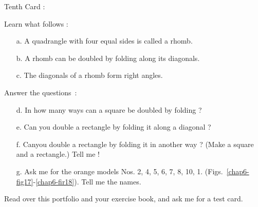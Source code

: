 Tenth Card :

Learn what follows :
\begin{itemize}
\item[a.] A quadrangle with four equal sides is called a rhomb.

\item[b.] A rhomb can be doubled by folding along its diagonals.

\item[c.] The diagonals of a rhomb form right angles.
\end{itemize}

Answer the questions~:
\begin{itemize}
\item[d.] In how many ways can a square be doubled by folding ?

\item[e.] Can you double a rectangle by folding it along a diagonal ?

\item[f.] Can\pageoriginale you double a rectangle by folding it in another way ? (Make a square and a rectangle.) Tell me !

\item[g.] Ask me for the orange models Nos. 2, 4, 5, 6, 7, 8, 10, 1. (Figs.~\ref{chap6-fig17}-\ref{chap6-fir18}). Tell me the names.
\end{itemize}

Read over this portfolio and your exercise book, and ask me for a test card.

